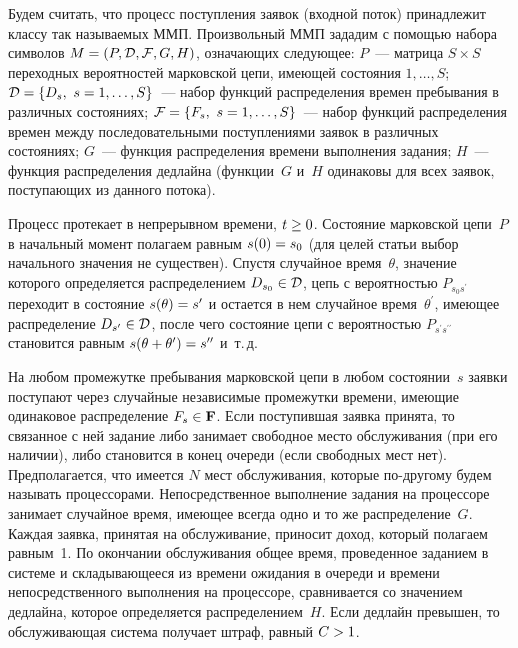 \begin{multicols}{2}
  Будем считать, что процесс поступления заявок (входной поток) принадлежит классу 
так называ\-емых ММП. Произвольный ММП 
зададим с по\-мощью набора символов $M\hm=(P,\mathcal{D},\mathcal{F},G,H)$, 
означающих следующее: $P$~--- матрица $S\times S$ переходных вероятностей марковской 
цепи, име\-ющей состояния $1,\ldots , S$; 
   $\mathcal{D}\hm= \{D_s,\ s\hm=1,\ldots , S\}$~--- набор функций распределения времен 
пребывания в различных состояниях; $\mathcal{F}\hm= \{F_s,\ s\hm=1,\ldots , S\}$~---  
 набор функций распределения времен между последовательными поступлениями заявок 
в различных состояниях; $G$~--- функция распределения времени выполнения задания; 
$H$~---  функция распределения дедлайна (функции~$G$ и~$H$ одинаковы для всех 
заявок, поступающих из данного потока).
  
  Процесс протекает в непрерывном времени, $t\hm\geq0$. Состояние марковской 
цепи~$P$ в начальный момент полагаем равным $s(0)\hm=s_0$ (для целей \mbox{статьи} выбор 
начального значения не существен). \mbox{Спустя} случайное время~$\theta$, значение которого 
определяется распределением $D_{s_0}\hm\in \mathcal{D}$, цепь с ве\-ро\-ят\-ностью 
$P_{s_0s^\prime}$ переходит в состояние $s(\theta)\hm=s^\prime$ и остается в нем 
случайное время~$\theta^\prime$, имеющее распределение $D_{s^\prime}\hm\in 
\mathcal{D}$, после чего состояние цепи с ве\-ро\-ят\-ностью $P_{s^\prime s^{\prime\prime}}$ 
становится равным $s(\theta\hm+\theta^\prime)\hm=s^{\prime\prime}$ и~т.\,д.
  
  На любом промежутке пребывания марковской цепи в любом состоянии~$s$ заявки 
поступают через случайные независимые промежутки времени, имеющие одинаковое 
распределение $F_s\hm\in \mathbf{F}$. Если поступившая заявка принята, то связанное с 
ней задание либо занимает свободное место обслуживания (при его наличии), либо 
становится в конец очереди (если свободных мест нет). Предполагается, что имеется $N$ 
мест обслуживания, которые по-дру\-го\-му будем называть процессорами. 
Непосредственное выполнение задания на процессоре занимает случайное время, 
имеющее всегда одно и то же распределение~$G$. Каждая заявка, принятая на 
обслуживание, приносит доход, который полагаем равным~1. По окончании 
обслуживания общее время, проведенное заданием в системе и складывающееся из 
времени ожидания в очереди и времени непосредственного выполнения на процессоре, 
сравнивается со значением дедлайна, которое определяется распределением~$H$. Если 
дедлайн превышен, то обслуживающая система получает штраф, равный $C\hm>1$.
  

\end{multicols}
